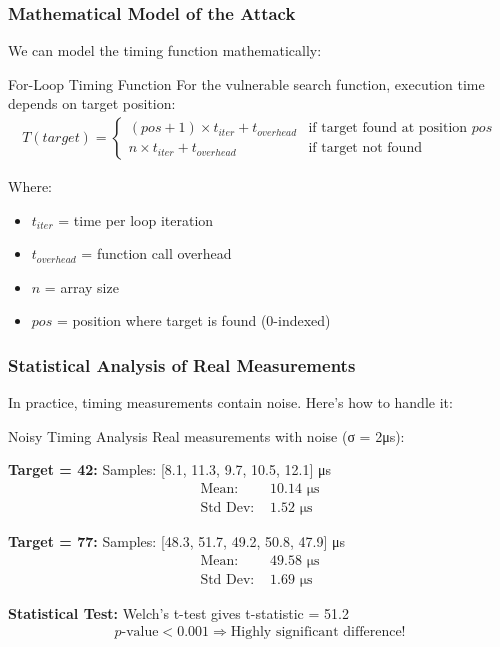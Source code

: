 \documentclass[12pt,a4paper]{article}
\theoremstyle{definition}
\begin{document}
\subsubsection{Mathematical Model of the Attack}

We can model the timing function mathematically:

\begin{definitionbox}{For-Loop Timing Function}
For the vulnerable search function, execution time depends on target position:
\begin{align}
T(target) = \begin{cases}
(pos + 1) \times t_{iter} + t_{overhead} & \text{if target found at position } pos \\
n \times t_{iter} + t_{overhead} & \text{if target not found}
\end{cases}
\end{align}

Where:
\begin{itemize}
    \item $t_{iter}$ = time per loop iteration
    \item $t_{overhead}$ = function call overhead  
    \item $n$ = array size
    \item $pos$ = position where target is found (0-indexed)
\end{itemize}
\end{definitionbox}

\subsubsection{Statistical Analysis of Real Measurements}

In practice, timing measurements contain noise. Here's how to handle it:

\begin{examplebox}{Noisy Timing Analysis}
Real measurements with noise (σ = 2μs):

\textbf{Target = 42:} Samples: [8.1, 11.3, 9.7, 10.5, 12.1] μs
\begin{align}
\text{Mean: } &10.14 \text{ μs} \\
\text{Std Dev: } &1.52 \text{ μs}
\end{align}

\textbf{Target = 77:} Samples: [48.3, 51.7, 49.2, 50.8, 47.9] μs  
\begin{align}
\text{Mean: } &49.58 \text{ μs} \\
\text{Std Dev: } &1.69 \text{ μs}
\end{align}

\textbf{Statistical Test:} Welch's t-test gives t-statistic = 51.2
\begin{align}
p\text{-value} < 0.001 \Rightarrow \text{Highly significant difference!}
\end{align}
\end{examplebox}
\end{document}
